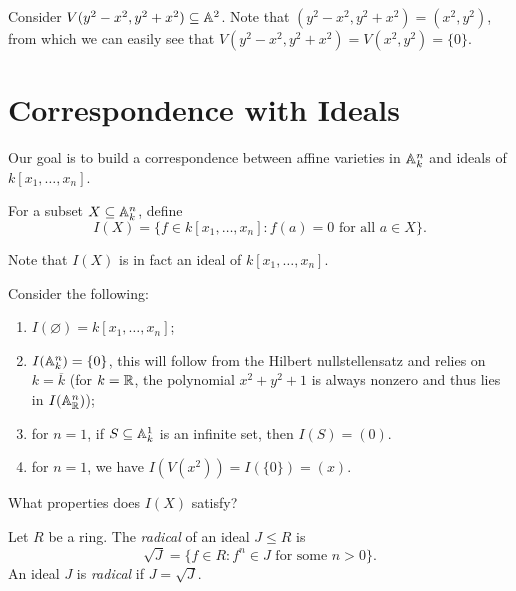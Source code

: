 \begin{example}
  Consider $V(y^2 - x^2, y^2 + x^2) \subseteq \mathbb{A}^2$.
  Note that $(y^2 - x^2, y^2 + x^2) = (x^2, y^2)$,
  from which we can easily see that
  $V(y^2 - x^2, y^2 + x^2) = V(x^2, y^2) = \{0\}$.
\end{example}

\section{Correspondence with Ideals}

\begin{remark}
  Our goal is to build a correspondence
  between affine varieties in $\mathbb{A}^n_k$
  and ideals of $k[x_1, \dots, x_n]$.
\end{remark}

\begin{definition}
  For a subset $X \subseteq \mathbb{A}^n_k$,
  define
  \[
    I(X) = \{f \in k[x_1, \dots, x_n] : f(a) = 0
      \text{ for all } a \in X\}.
  \]
\end{definition}

\begin{remark}
  Note that $I(X)$ is in fact an ideal of
  $k[x_1, \dots, x_n]$.
\end{remark}

\begin{example}
  Consider the following:
  \begin{enumerate}
    \item $I(\varnothing) = k[x_1, \dots, x_n]$;
    \item $I(\mathbb{A}^n_k) = \{0\}$, this
      will follow from the
      Hilbert nullstellensatz and
      relies on $k = \overline{k}$ (for
      $k = \mathbb{R}$, the polynomial $x^2 + y^2 + 1$ is
      always nonzero and thus lies in
      $I(\mathbb{A}^n_{\mathbb{R}})$);
    \item for $n = 1$, if
      $S \subseteq \mathbb{A}^1_k$ is an
      infinite set, then $I(S) = (0)$.
    \item for $n = 1$, we have
      $I(V(x^2)) = I(\{0\}) = (x)$.
  \end{enumerate}
\end{example}

\begin{remark}
  What properties does $I(X)$ satisfy?
\end{remark}

\begin{definition}
  Let $R$ be a ring.
  The \emph{radical} of an ideal
  $J \le R$ is
  \[
    \sqrt{J} = \{
      f \in R : f^n \in J \text{ for some }
      n > 0
    \}.
  \]
  An ideal $J$ is \emph{radical} if
  $J = \sqrt{J}$.
\end{definition}

